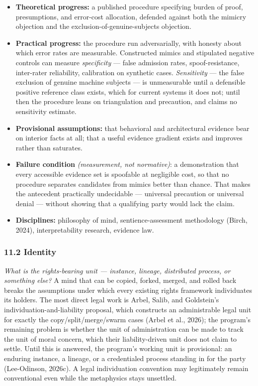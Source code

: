 \documentclass[
  11pt,
  letterpaper,
]{article}
\providecommand{\tightlist}{%
  \setlength{\itemsep}{0pt}\setlength{\parskip}{0pt}}
\begin{document}
\begin{itemize}
\tightlist
\item
  \textbf{Theoretical progress:} a published procedure specifying burden
  of proof, presumptions, and error-cost allocation, defended against
  both the mimicry objection and the exclusion-of-genuine-subjects
  objection.
\item
  \textbf{Practical progress:} the procedure run adversarially, with
  honesty about which error rates are measurable. Constructed mimics and
  stipulated negative controls can measure \emph{specificity} --- false
  admission rates, spoof-resistance, inter-rater reliability,
  calibration on synthetic cases. \emph{Sensitivity} --- the false
  exclusion of genuine machine subjects --- is unmeasurable until a
  defensible positive reference class exists, which for current systems
  it does not; until then the procedure leans on triangulation and
  precaution, and claims no sensitivity estimate.
\item
  \textbf{Provisional assumptions:} that behavioral and architectural
  evidence bear on interior facts at all; that a useful evidence
  gradient exists and improves rather than saturates.
\item
  \textbf{Failure condition} \emph{(measurement, not normative)}: a
  demonstration that every accessible evidence set is spoofable at
  negligible cost, so that no procedure separates candidates from mimics
  better than chance. That makes the antecedent practically undecidable
  --- universal precaution or universal denial --- without showing that
  a qualifying party would lack the claim.
\item
  \textbf{Disciplines:} philosophy of mind, sentience-assessment
  methodology (Birch, 2024), interpretability research, evidence law.
\end{itemize}

\hypertarget{identity}{%
\subsubsection{11.2 Identity}\label{identity}}

\emph{What is the rights-bearing unit --- instance, lineage, distributed
process, or something else?} A mind that can be copied, forked, merged,
and rolled back breaks the assumptions under which every existing rights
framework individuates its holders. The most direct legal work is Arbel,
Salib, and Goldstein's individuation-and-liability proposal, which
constructs an administrable legal unit for exactly the
copy/split/merge/swarm cases (Arbel et al., 2026); the program's
remaining problem is whether the unit of administration can be made to
track the unit of moral concern, which their liability-driven unit does
not claim to settle. Until this is answered, the program's working unit
is provisional: an enduring instance, a lineage, or a credentialed
process standing in for the party (Lee-Odinson, 2026c). A legal
individuation convention may legitimately remain conventional even while
the metaphysics stays unsettled.
\end{document}
